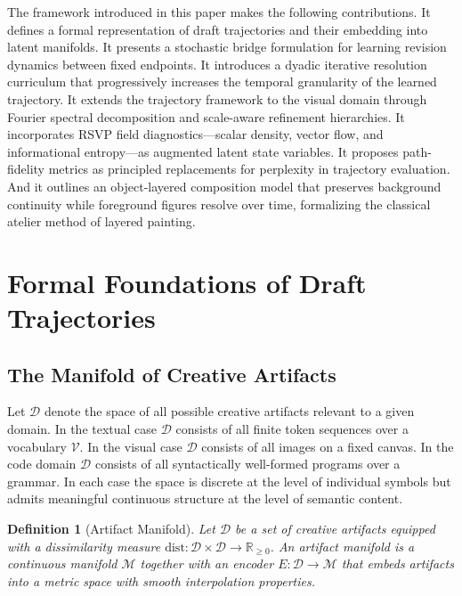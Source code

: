 \documentclass[12pt,a4paper]{article}
\theoremstyle{draftthm}
\newtheorem{definition}{Definition}[section]
\newcommand{\D}{\mathcal{D}}
\newcommand{\enc}{E}
\begin{document}
The framework introduced in this paper makes the following contributions. It defines a formal representation of draft trajectories and their embedding into latent manifolds. It presents a stochastic bridge formulation for learning revision dynamics between fixed endpoints. It introduces a dyadic iterative resolution curriculum that progressively increases the temporal granularity of the learned trajectory. It extends the trajectory framework to the visual domain through Fourier spectral decomposition and scale-aware refinement hierarchies. It incorporates RSVP field diagnostics---scalar density, vector flow, and informational entropy---as augmented latent state variables. It proposes path-fidelity metrics as principled replacements for perplexity in trajectory evaluation. And it outlines an object-layered composition model that preserves background continuity while foreground figures resolve over time, formalizing the classical atelier method of layered painting.

\section{Formal Foundations of Draft Trajectories}

\subsection{The Manifold of Creative Artifacts}

Let $\D$ denote the space of all possible creative artifacts relevant to a given domain. In the textual case $\D$ consists of all finite token sequences over a vocabulary $\mathcal{V}$. In the visual case $\D$ consists of all images on a fixed canvas. In the code domain $\D$ consists of all syntactically well-formed programs over a grammar. In each case the space is discrete at the level of individual symbols but admits meaningful continuous structure at the level of semantic content.

\begin{definition}[Artifact Manifold]
  Let $\D$ be a set of creative artifacts equipped with a dissimilarity measure $\mathrm{dist}: \D \times \D \to \mathbb{R}_{\geq 0}$. An \emph{artifact manifold} is a continuous manifold $\mathcal{M}$ together with an encoder $\enc: \D \to \mathcal{M}$ that embeds artifacts into a metric space with smooth interpolation properties.
\end{definition}
\end{document}
